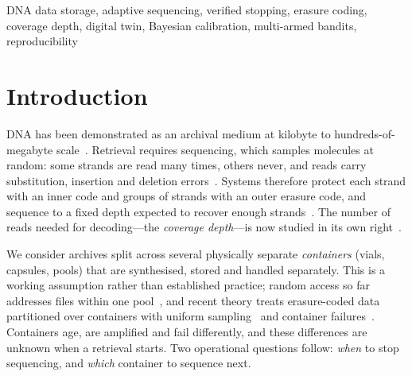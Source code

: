 \documentclass[conference,onecolumn,11pt]{IEEEtran}
\begin{document}
\begin{abstract}
fixed proportions reduced it by 450 reads ($-$8.7\%) with an interval excluding zero.  Over \SafeN{}
end-to-end retrievals, covering every configuration in the paper except the clean-reproduction re-runs,
no output file was wrong, and no wrong payload passed the inner checks in \SafeAtt{} decode attempts.
Because these retrievals share \SafeUnits{} synthesis replicates, we report both the per-retrieval upper
limit (\SafeWUB{}) and the per-synthesis limit (\SafeWUBc{}).  A replay of real Illumina streams from two
vendor pools, with calibration and evaluation reads kept disjoint, gives the same ranking.  It also
contains the one case in which allocation pays substantially: a prior calibrated on held-out reads of the
same containers identified the weak container before retrieval and saved 16\% per retrieval, but it
required 1.8M calibration reads, 2.8 times the cost of one retrieval, and so breaks even only after
about 17 retrievals of the same archive.
\end{abstract}

\begin{IEEEkeywords}
DNA data storage, adaptive sequencing, verified stopping, erasure coding, coverage depth, digital twin, Bayesian calibration, multi-armed bandits, reproducibility
\end{IEEEkeywords}

\section{Introduction}
DNA has been demonstrated as an archival medium at kilobyte to hundreds-of-megabyte
scale~\cite{church2012next,goldman2013towards,grass2015robust,erlich2017fountain,organick2018random}.
Retrieval requires sequencing, which samples molecules at random: some strands are read
many times, others never, and reads carry substitution, insertion and deletion
errors~\cite{heckel2019characterization,gimpel2023digital}.  Systems therefore protect each
strand with an inner code and groups of strands with an outer erasure code, and sequence to a
fixed depth expected to recover enough strands~\cite{grass2015robust,organick2018random}.  The
number of reads needed for decoding---the \emph{coverage depth}---is now studied in its own
right~\cite{barlev2025cover,gruica2024combinatorial}.

We consider archives split across several physically separate \emph{containers} (vials,
capsules, pools) that are synthesised, stored and handled separately.  This is a working
assumption rather than established practice; random access so far addresses files within one
pool~\cite{bornholt2016dna,organick2018random}, and recent theory treats erasure-coded data
partitioned over containers with uniform sampling~\cite{kong2026coverage} and container
failures~\cite{levy2026expected}.  Containers age, are amplified and fail differently, and
these differences are unknown when a retrieval starts.  Two operational questions follow:
\emph{when} to stop sequencing, and \emph{which} container to sequence next.
\end{document}

